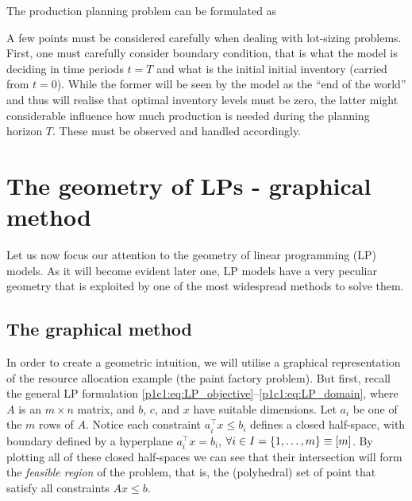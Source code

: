 The production planning problem can be formulated as
%
%

A few points must be considered carefully when dealing with lot-sizing problems. First, one must carefully consider boundary condition, that is what the model is deciding in time periods $t = T$ and what is the initial initial inventory (carried from $t=0$). While the former will be seen by the model as the ``end of the world'' and thus will realise that optimal inventory levels must be zero, the latter might considerable influence how much production is needed during the planning horizon $T$. These must be observed and handled accordingly. 
 


\section{The geometry of LPs - graphical method} 

Let us now focus our attention to the geometry of linear programming (LP) models. As it will become evident later one, LP models have a very peculiar geometry that is exploited by one of the most widespread methods to solve them. 

\subsection{The graphical method}

In order to create a geometric intuition, we will utilise a graphical representation of the resource allocation example (the paint factory problem). But first, recall the general LP formulation \eqref{p1c1:eq:LP_objective}--\eqref{p1c1:eq:LP_domain}, where $A$ is an $m \times n$ matrix, and $b$, $c$, and $x$ have suitable dimensions. Let $a_i$ be one of the $m$ rows of $A$. Notice each constraint $a_i^\top x \leq b_i$ defines a closed half-space, with boundary defined by a hyperplane $a_i^\top x= b_i$, $\forall i \in I = \left\{ 1,\dots,m \right \} \equiv [m]$. By plotting all of these closed half-spaces we can see that their intersection will form the \emph{feasible region} of the problem, that is, the (polyhedral) set of point that satisfy all constraints $Ax \le b$. 


